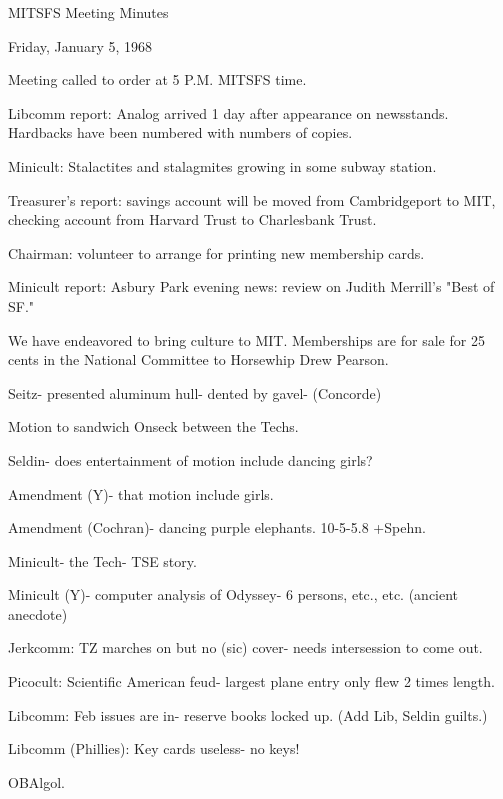 \documentclass[12pt]{article}
\begin{document}
\begin{center}

MITSFS Meeting Minutes

Friday, January 5, 1968

\end{center}
 
\vspace{12pt}

\setlength{\parskip}{6pt}

\noindent
Meeting called to order at 5 P.M. MITSFS time.

Libcomm report: Analog arrived 1 day after appearance on newsstands. Hardbacks have been numbered with numbers of copies.

Minicult: Stalactites and stalagmites growing in some subway station.

Treasurer's report: savings account will be moved from Cambridgeport to MIT, checking account from Harvard Trust to Charlesbank Trust.

Chairman: volunteer to arrange for printing new membership cards.

Minicult report: Asbury Park evening news: review on Judith Merrill's "Best of SF."

We have endeavored to bring culture to MIT. Memberships are for sale for 25 cents in the National Committee to Horsewhip Drew Pearson.

Seitz- presented aluminum hull- dented by gavel- (Concorde)

Motion to sandwich Onseck between the Techs.

Seldin- does entertainment of motion include dancing girls?

Amendment (Y)- that motion include girls.

Amendment (Cochran)- dancing purple elephants. 10-5-5.8 +Spehn.

Minicult- the Tech- TSE story.

Minicult (Y)- computer analysis of Odyssey- 6 persons, etc., etc. (ancient anecdote)

Jerkcomm: TZ marches on but no (sic) cover- needs intersession to come out.

Picocult: Scientific American feud- largest plane entry only flew 2 times length.

Libcomm: Feb issues are in- reserve books locked up. (Add Lib, Seldin guilts.)

Libcomm (Phillies): Key cards useless- no keys!

OBAlgol.
\end{document}
